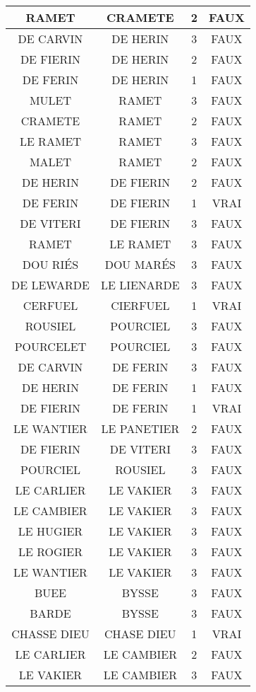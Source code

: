 \begin{center}
\begin{longtable}{|c|c|c|c|}
\hline	RAMET	&	CRAMETE	&	2	&	FAUX	\\
\hline	DE CARVIN	&	DE HERIN	&	3	&	FAUX	\\
\hline	DE FIERIN	&	DE HERIN	&	2	&	FAUX	\\
\hline	DE FERIN	&	DE HERIN	&	1	&	FAUX	\\
\hline	MULET	&	RAMET	&	3	&	FAUX	\\
\hline	CRAMETE	&	RAMET	&	2	&	FAUX	\\
\hline	LE RAMET	&	RAMET	&	3	&	FAUX	\\
\hline	MALET	&	RAMET	&	2	&	FAUX	\\
\hline	DE HERIN	&	DE FIERIN	&	2	&	FAUX	\\
\hline	DE FERIN	&	DE FIERIN	&	1	&	VRAI	\\
\hline	DE VITERI	&	DE FIERIN	&	3	&	FAUX	\\
\hline	RAMET	&	LE RAMET	&	3	&	FAUX	\\
\hline	DOU RIÉS	&	DOU MARÉS	&	3	&	FAUX	\\
\hline	DE LEWARDE	&	LE LIENARDE	&	3	&	FAUX	\\
\hline	CERFUEL	&	CIERFUEL	&	1	&	VRAI	\\
\hline	ROUSIEL	&	POURCIEL	&	3	&	FAUX	\\
\hline	POURCELET	&	POURCIEL	&	3	&	FAUX	\\
\hline	DE CARVIN	&	DE FERIN	&	3	&	FAUX	\\
\hline	DE HERIN	&	DE FERIN	&	1	&	FAUX	\\
\hline	DE FIERIN	&	DE FERIN	&	1	&	VRAI	\\
\hline	LE WANTIER	&	LE PANETIER	&	2	&	FAUX	\\
\hline	DE FIERIN	&	DE VITERI	&	3	&	FAUX	\\
\hline	POURCIEL	&	ROUSIEL	&	3	&	FAUX	\\
\hline	LE CARLIER	&	LE VAKIER	&	3	&	FAUX	\\
\hline	LE CAMBIER	&	LE VAKIER	&	3	&	FAUX	\\
\hline	LE HUGIER	&	LE VAKIER	&	3	&	FAUX	\\
\hline	LE ROGIER	&	LE VAKIER	&	3	&	FAUX	\\
\hline	LE WANTIER	&	LE VAKIER	&	3	&	FAUX	\\
\hline	BUEE	&	BYSSE	&	3	&	FAUX	\\
\hline	BARDE	&	BYSSE	&	3	&	FAUX	\\
\hline	CHASSE DIEU	&	CHASE DIEU	&	1	&	VRAI	\\
\hline	LE CARLIER	&	LE CAMBIER	&	2	&	FAUX	\\
\hline	LE VAKIER	&	LE CAMBIER	&	3	&	FAUX	\\

\end{longtable}
\end{center}
